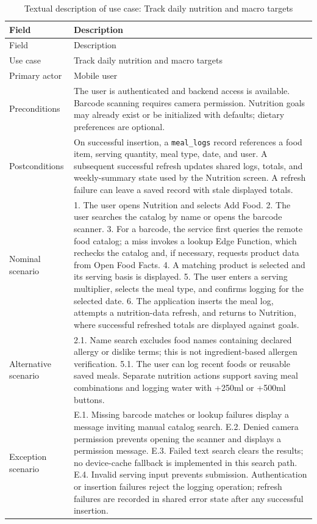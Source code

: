 \documentclass[12pt,a4paper,openany]{report}
\begin{document}
\begingroup
\footnotesize
\setlength{\tabcolsep}{3pt}
\renewcommand{\arraystretch}{1.20}
\setlength{\LTpre}{5pt}
\setlength{\LTpost}{10pt}
\begin{longtable}{|L{4.95cm}|L{10.05cm}|}
\caption{Textual description of use case: Track daily nutrition and macro targets}\label{tab:pdf-52-24} \\
\hline
{}
Field & Description \\ \hline
\endfirsthead
\hline
{}
Field & Description \\ \hline
\endhead
Use case & Track daily nutrition and macro targets \\ \hline
Primary actor & Mobile user \\ \hline
Preconditions & The user is authenticated and backend access is available. Barcode scanning requires camera permission. Nutrition goals may already exist or be initialized with defaults; dietary preferences are optional. \\ \hline
Postconditions & On successful insertion, a \texttt{meal\_logs} record references a food item, serving quantity, meal type, date, and user. A subsequent successful refresh updates shared logs, totals, and weekly-summary state used by the Nutrition screen. A refresh failure can leave a saved record with stale displayed totals. \\ \hline
Nominal scenario & 1. The user opens Nutrition and selects Add Food. 2. The user searches the catalog by name or opens the barcode scanner. 3. For a barcode, the service first queries the remote food catalog; a miss invokes a lookup Edge Function, which rechecks the catalog and, if necessary, requests product data from Open Food Facts. 4. A matching product is selected and its serving basis is displayed. 5. The user enters a serving multiplier, selects the meal type, and confirms logging for the selected date. 6. The application inserts the meal log, attempts a nutrition-data refresh, and returns to Nutrition, where successful refreshed totals are displayed against goals. \\ \hline
Alternative scenario & 2.1. Name search excludes food names containing declared allergy or dislike terms; this is not ingredient-based allergen verification. 5.1. The user can log recent foods or reusable saved meals. Separate nutrition actions support saving meal combinations and logging water with +250ml or +500ml buttons. \\ \hline
Exception scenario & E.1. Missing barcode matches or lookup failures display a message inviting manual catalog search. E.2. Denied camera permission prevents opening the scanner and displays a permission message. E.3. Failed text search clears the results; no device-cache fallback is implemented in this search path. E.4. Invalid serving input prevents submission. Authentication or insertion failures reject the logging operation; refresh failures are recorded in shared error state after any successful insertion. \\ \hline
\end{longtable}
\endgroup
\end{document}
